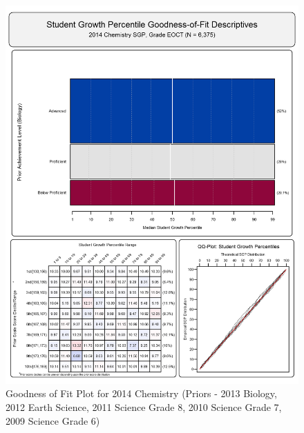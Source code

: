 \documentclass[12pt]{article}
\begin{document}
\begin{figure}[htbp]
\centering
\includegraphics{../img/Goodness_of_Fit/CHEMISTRY.2014/2014_CHEMISTRY_EOCT;2013_BIOLOGY_EOCT;2012_EARTH_SCIENCE_EOCT;2011_SCIENCE_8;2010_SCIENCE_7;2009_SCIENCE_6.png}
\caption{Goodness of Fit Plot for 2014 Chemistry (Priors - 2013 Biology,
2012 Earth Science, 2011 Science Grade 8, 2010 Science Grade 7, 2009
Science Grade 6)}
\end{figure}
\end{document}
